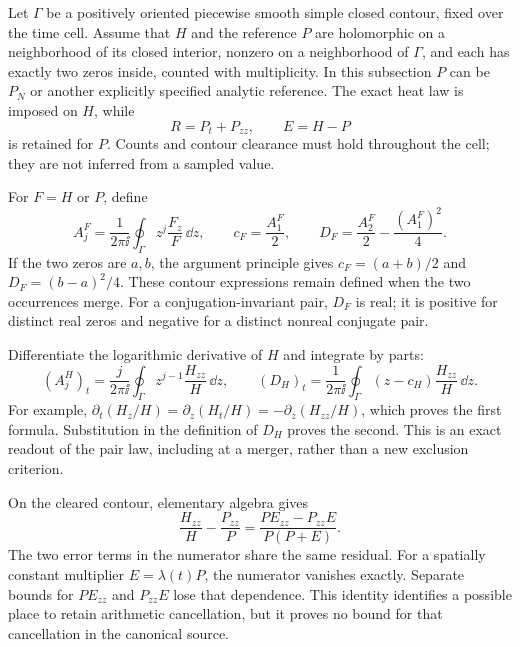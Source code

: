 Let $\Gamma$ be a positively oriented piecewise smooth simple closed
contour, fixed over the time cell.  Assume that $H$ and the reference
$P$ are holomorphic on a neighborhood of its closed interior, nonzero
on a neighborhood of $\Gamma$, and each has exactly two zeros inside,
counted with multiplicity.  In this subsection
$P$ can be $P_N$ or another explicitly specified analytic reference.
The exact heat law is imposed on $H$, while
\begin{equation}
 R=P_t+P_{zz},\qquad E=H-P
 \label{rt:general-reference}
\end{equation}
is retained for $P$.  Counts and contour clearance must hold throughout
the cell; they are not inferred from a sampled value.

For $F=H$ or $P$, define
\begin{equation}
 A_j^F=\frac1{2\pi\ii}\oint_\Gamma z^j\frac{F_z}{F}\,\dd z,
 \qquad c_F=\frac{A_1^F}{2},\qquad
 D_F=\frac{A_2^F}{2}-\frac{(A_1^F)^2}{4}.
 \label{rt:pair-moments}
\end{equation}
If the two zeros are $a,b$, the argument principle gives
$c_F=(a+b)/2$ and $D_F=(b-a)^2/4$.  These contour expressions remain
defined when the two occurrences merge.  For a conjugation-invariant
pair, $D_F$ is real; it is positive for distinct real zeros and
negative for a distinct nonreal conjugate pair.

Differentiate the logarithmic derivative of $H$ and integrate by parts:
\begin{equation}
 (A_j^H)_t=\frac{j}{2\pi\ii}\oint_\Gamma
                          z^{j-1}\frac{H_{zz}}H\,\dd z,
 \qquad
 (D_H)_t=\frac1{2\pi\ii}\oint_\Gamma
                          (z-c_H)\frac{H_{zz}}H\,\dd z.
 \label{rt:exact-gap-readout}
\end{equation}
For example,
$\partial_t(H_z/H)=\partial_z(H_t/H)
=-\partial_z(H_{zz}/H)$, which proves the first formula.  Substitution
in the definition of $D_H$ proves the second.  This is an exact readout
of the pair law, including at a merger, rather than a new exclusion
criterion.

On the cleared contour, elementary algebra gives
\begin{equation}
 \frac{H_{zz}}H-\frac{P_{zz}}P
       =\frac{P E_{zz}-P_{zz}E}{P(P+E)}.
 \label{rt:joint-quotient}
\end{equation}
The two error terms in the numerator share the same residual.  For a
spatially constant multiplier $E=\lambda(t)P$, the numerator vanishes
exactly.  Separate bounds for $P E_{zz}$ and $P_{zz}E$ lose that
dependence.  This identity identifies a possible place to retain
arithmetic cancellation, but it proves no bound for that cancellation
in the canonical source.

